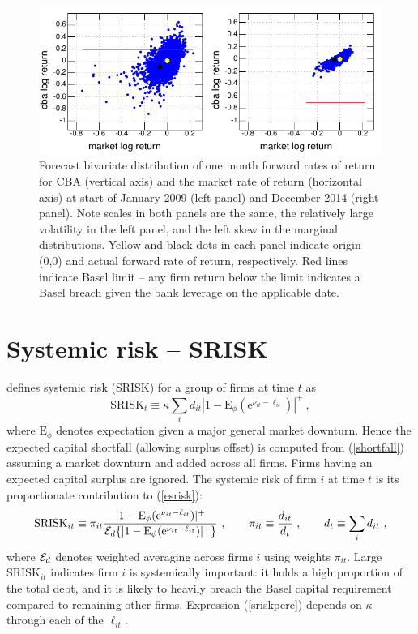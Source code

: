 \documentclass[authoryear]{elsarticle}
\newcommand{\E}{\mathrm{E}}
\newcommand{\e}{\mathrm{e}}
\newcommand{\Ex}{{\cal E}}
\newcommand{\Es}{\E_\phi}
\newcommand{\eref}[1]{(\ref{#1})}
\newcommand{\cq}{\ , \qquad}
\newcommand{\be}[1]{\begin{equation}\label{#1}}
\newcommand{\ee}{\end{equation}}
\begin{document}
\begin{figure}[htbp]
\begin{center}
\includegraphics{figures/simulation.pdf}
\caption{Forecast bivariate distribution of one month forward rates of return   for CBA (vertical axis) and the market rate of return (horizontal axis) at start of January 2009 (left panel)  and December 2014 (right panel). Note scales in both panels are the same, the relatively large volatility in the left panel, and the left skew in the  marginal distributions.  Yellow and black dots in each panel indicate origin (0,0) and  actual forward  rate of return, respectively.   Red lines indicate Basel limit -- any firm return below the limit indicates a Basel breach given the bank leverage on the applicable date.}
\label{simulation}
\end{center}
\end{figure}




\section{Systemic risk -- SRISK}\label{srisk}

 \cite{brownlees2015} defines  systemic risk (SRISK) for a group of firms  at time $t$ as
\be{esrisk}
\mathrm{SRISK}_t\equiv\kappa\sum_i d_{it}\left|1-\Es(\e^{\nu_{it}-\ell_{it}})\right|^+ \ ,
\ee
where  $\Es$ denotes expectation given a major general market downturn. Hence the expected capital shortfall (allowing surplus offset) is computed from \eref{shortfall} assuming a market downturn and added across all firms. Firms having an expected capital surplus are ignored. The systemic risk of firm $i$ at time $t$ is its proportionate contribution to \eref{esrisk}:
 \be{sriskperc}
 \mathrm{SRISK}_{it}\equiv \pi_{it}\frac{|1-\Es(\e^{\nu_{it}-\ell_{it}})|^+}{\Ex_d\{|1-\Es(\e^{\nu_{it}-\ell_{it}})|^+\}}\cq \pi_{it}\equiv \frac{d_{it}}{d_t}\cq d_t\equiv \sum_i d_{it}\ ,
 \ee
where $\Ex_d$ denotes weighted averaging across firms $i$ using weights $\pi_{it}$.     Large $\mathrm{SRISK}_{it}$ indicates firm $i$ is systemically important: it holds a high proportion of the total debt, and it is likely to heavily breach the Basel capital requirement compared to remaining other firms.  Expression \eref{sriskperc} depends on $\kappa$ through each of the $\ell_{it}$.
\end{document}
